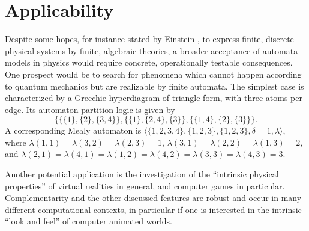 \documentclass{llncs}
\begin{document}
\section{Applicability}

Despite some hopes, for instance stated by Einstein \cite[p.~163]{ein1},
to express finite, discrete physical systems by finite, algebraic theories,
a broader acceptance of automata models in physics would
require concrete, operationally testable consequences.
One prospect would be to search for phenomena which cannot happen according to
quantum mechanics but are realizable by finite automata.
The simplest case is characterized by a Greechie hyperdiagram of triangle form,
with three atoms per edge. Its automaton partition logic is given by
\begin{equation}
\{
\{\{1\},\{2\},\{3,4\}\},
\{\{1\},\{2,4\},\{3\}\},
\{\{1,4\},\{2\},\{3\}\}
\}.
\end{equation}
A corresponding Mealy automaton is
$\langle \{1,2,3,4\},\{1,2,3\},\{1,2,3\},\delta =1 ,\lambda \rangle$, where
$
\lambda (1,1)=
\lambda (3,2)=
\lambda (2,3)=
1
$,
$
\lambda (3,1)=
\lambda (2,2)=
\lambda (1,3)=
2
$, and
$
\lambda (2,1)= \lambda (4,1)=
\lambda (1,2)= \lambda (4,2)=
\lambda (3,3)= \lambda (4,3)=
3
$.

Another potential application is the investigation of the ``intrinsic
physical properties'' of virtual realities in general, and computer games in particular.
Complementarity and the other discussed features are robust
and occur in many different computational contexts, in particular
if one is interested in the intrinsic ``look and feel'' of computer animated worlds.



%
%
%
%
\end{document}
